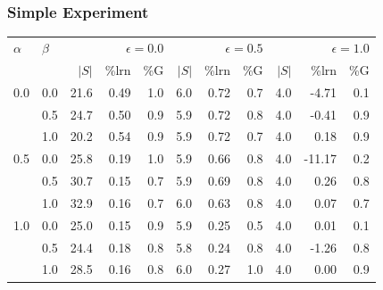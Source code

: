 \documentclass{beamer}
\begin{document}
\begin{frame}
  \frametitle{Simple Experiment}\footnotesize
          {\newcolumntype{A}{r}}
          {\newcolumntype{B}{r}}
          {\newcolumntype{C}{r}}

\centering
\def\toprule{\hline}
\def\midrule{\hline\hline}
\def\bottomrule{\hline}
\tabcolsep=3pt
\begin{tabular}{|l|l|B|B|B|C|C|C|A|A|A|}
\toprule
$\alpha$ & $\beta$ & 
 & 
 & 
 \\  
& & $|S|$ & \%lrn & \%G & 
$|S|$ & \%lrn & \%G & 
$|S|$ & \%lrn & \%G \\ \midrule
0.0 & 0.0 &          21.6 &        0.49 &           1.0 & 
                      6.0 &        0.72 &           0.7 & 
                      4.0 &       -4.71 &           0.1 \\
    & 0.5 &          24.7 &        0.50 &           0.9 & 
                      5.9 &        0.72 &           0.8 & 
                      4.0 &       -0.41 &           0.9 \\
    & 1.0 &          20.2 &        0.54 &           0.9 & 
                      5.9 &        0.72 &           0.7 & 
                      4.0 &        0.18 &           0.9 \\ 
0.5 & 0.0 &          25.8 &        0.19 &           1.0 & 
                      5.9 &        0.66 &           0.8 & 
                      4.0 &      -11.17 &           0.2 \\
    & 0.5 &          30.7 &        0.15 &           0.7 & 
                      5.9 &        0.69 &           0.8 & 
                      4.0 &        0.26 &           0.8 \\
    & 1.0 &          32.9 &        0.16 &           0.7 & 
                      6.0 &        0.63 &           0.8 & 
                      4.0 &        0.07 &           0.7 \\
1.0 & 0.0 &          25.0 &        0.15 &           0.9 & 
                      5.9 &        0.25 &           0.5 & 
                      4.0 &        0.01 &           0.1 \\
    & 0.5 &          24.4 &        0.18 &           0.8 & 
                      5.8 &        0.24 &           0.8 & 
                      4.0 &       -1.26 &           0.8 \\
    & 1.0 &          28.5 &        0.16 &           0.8 & 
                     6.0 &        0.27 &           1.0 & 
                      4.0 &        0.00 &           0.9 \\
\bottomrule
\end{tabular}


\end{frame}
\end{document}
